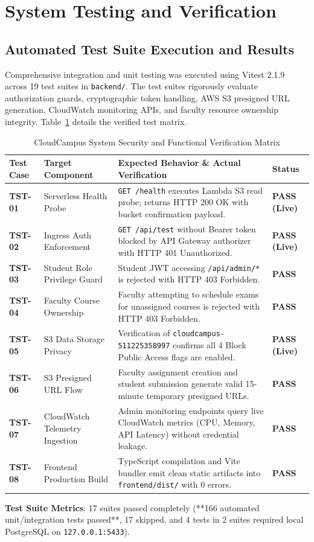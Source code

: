 \newpage
\section{System Testing and Verification}

\subsection{Automated Test Suite Execution and Results}
Comprehensive integration and unit testing was executed using Vitest 2.1.9 across 19 test suites in \texttt{backend/}. The test suites rigorously evaluate authorization guards, cryptographic token handling, AWS S3 presigned URL generation, CloudWatch monitoring APIs, and faculty resource ownership integrity. Table~\ref{tab:test_verification_matrix} details the verified test matrix.

\begin{table}[H]
\centering
\small
\renewcommand{\arraystretch}{1.15}
\begin{tabularx}{\textwidth}{l p{3.2cm} X l}
\toprule
\textbf{\color{primaryblue}Test Case} & \textbf{\color{primaryblue}Target Component} & \textbf{\color{primaryblue}Expected Behavior \& Actual Verification} & \textbf{\color{primaryblue}Status} \\
\midrule
\textbf{TST-01} & Serverless Health Probe & \texttt{GET /health} executes Lambda S3 read probe; returns HTTP 200 OK with bucket confirmation payload. & \textbf{PASS (Live)} \\
\addlinespace
\textbf{TST-02} & Ingress Auth Enforcement & \texttt{GET /api/test} without Bearer token blocked by API Gateway authorizer with HTTP 401 Unauthorized. & \textbf{PASS (Live)} \\
\addlinespace
\textbf{TST-03} & Student Role Privilege Guard & Student JWT accessing \texttt{/api/admin/*} is rejected with HTTP 403 Forbidden. & \textbf{PASS} \\
\addlinespace
\textbf{TST-04} & Faculty Course Ownership & Faculty attempting to schedule exams for unassigned courses is rejected with HTTP 403 Forbidden. & \textbf{PASS} \\
\addlinespace
\textbf{TST-05} & S3 Data Storage Privacy & Verification of \texttt{cloudcampus-511225358997} confirms all 4 Block Public Access flags are enabled. & \textbf{PASS (Live)} \\
\addlinespace
\textbf{TST-06} & S3 Presigned URL Flow & Faculty assignment creation and student submission generate valid 15-minute temporary presigned URLs. & \textbf{PASS} \\
\addlinespace
\textbf{TST-07} & CloudWatch Telemetry Ingestion & Admin monitoring endpoints query live CloudWatch metrics (CPU, Memory, API Latency) without credential leakage. & \textbf{PASS} \\
\addlinespace
\textbf{TST-08} & Frontend Production Build & TypeScript compilation and Vite bundler emit clean static artifacts into \texttt{frontend/dist/} with 0 errors. & \textbf{PASS} \\
\bottomrule
\end{tabularx}
\caption{CloudCampus System Security and Functional Verification Matrix}
\label{tab:test_verification_matrix}
\end{table}

\noindent \textbf{Test Suite Metrics}: 17 suites passed completely (**166 automated unit/integration tests passed**, 17 skipped, and 4 tests in 2 suites required local PostgreSQL on \texttt{127.0.0.1:5433}).
